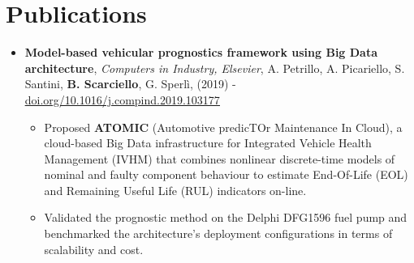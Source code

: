\documentclass[letterpaper,10pt]{article}
\newcommand{\resumeItem}[1]{
  \item\small{
    {#1 \vspace{-2pt}}
  }
}
\newcommand{\fancyurl}[2]{\textcolor{BlueViolet}{\href{#1}{\underline{#2}}}}
\newcommand{\resumePaperTitle}[5]{
    \vspace{2pt}
    \item
    \small{\textbf{#1}, \textit{#2}, #3, (#4) - #5} \\
}
\newcommand{\resumeSubHeadingPublicationsListStart}{\begin{itemize}[leftmargin=0.15in, rightmargin=0.05in, label={}]}
\newcommand{\resumeSubHeadingListEnd}{\end{itemize}}
\newcommand{\resumeItemListStart}{\begin{itemize}[rightmargin=0.1in]\vspace{-3pt}}
\newcommand{\resumeItemListEnd}{\end{itemize}\vspace{-3pt}}
\begin{document}
\section{Publications}
  \resumeSubHeadingPublicationsListStart
    \resumePaperTitle
      {Model-based vehicular prognostics framework using Big Data architecture}
      {Computers in Industry, Elsevier}
      {A. Petrillo, A. Picariello, S. Santini, \textbf{B. Scarciello}, G. Sperl\`i}
      {2019}
      {\fancyurl{https://doi.org/10.1016/j.compind.2019.103177}{doi.org/10.1016/j.compind.2019.103177}}
    \resumeItemListStart
      \resumeItem{
        Proposed \textbf{ATOMIC} (Automotive predicTOr Maintenance In Cloud), a cloud-based Big Data
        infrastructure for Integrated Vehicle Health Management (IVHM) that combines nonlinear
        discrete-time models of nominal and faulty component behaviour to estimate End-Of-Life (EOL)
        and Remaining Useful Life (RUL) indicators on-line.
      }
      \resumeItem{
        Validated the prognostic method on the Delphi DFG1596 fuel pump and benchmarked the
        architecture's deployment configurations in terms of scalability and cost.
      }
    \resumeItemListEnd
  \resumeSubHeadingListEnd

\end{document}
